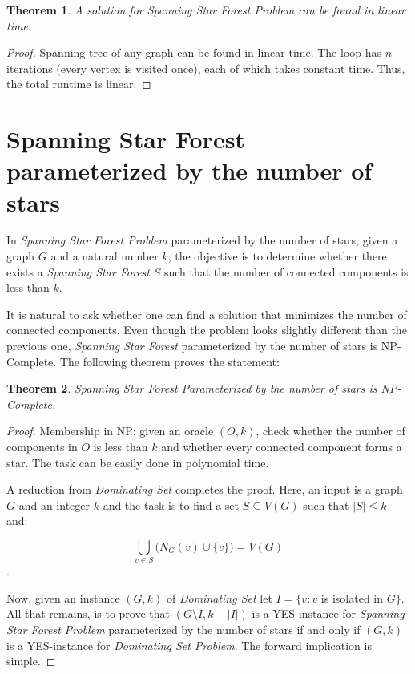 \documentclass[en]{pracamgr}
\newtheorem{theorem}{Theorem}
\begin{document}
\begin{theorem}
	A solution for Spanning Star Forest Problem can be found in linear time.
\end{theorem}

\begin{proof}
	Spanning tree of any graph can be found in linear time. The loop has $n$ 
	iterations (every vertex is visited once), each of which takes constant time.
	Thus, the total runtime is linear.
\end{proof}

\section{Spanning Star Forest parameterized by the number of stars}

In \emph{Spanning Star Forest Problem} parameterized by the number of
stars, given a graph $G$ and a natural number $k$, the objective is to
determine whether there exists a \emph{Spanning Star Forest} $S$ such that
the number of connected components is less than $k$.

It is natural to ask whether one can find a solution that minimizes the number
of connected components. Even though the problem looks slightly different
than the previous one, \emph{Spanning Star Forest} parameterized by the 
number of stars is NP-Complete. The following theorem proves the statement:

\begin{theorem}
	Spanning Star Forest Parameterized by the number of stars is NP-Complete.
\end{theorem}



\begin{proof}
	Membership in NP: given an oracle $(O,k)$, check whether the number of
	components in $O$ is less than $k$ and whether every connected component 
	forms a star. The task can be easily done in polynomial time.
	
	A reduction from \emph{Dominating Set} completes the proof. Here, an input
	is a graph $G$ and an integer $k$ and the task is to find a set 
	$S \subseteq V(G)$ such that $|S|\leq k$ and:
	
	$$\bigcup_{v \in S} \big(N_G(v) \cup \{v\}\big) = V(G)$$.
	
	Now, given an instance $(G,k)$ of \emph{Dominating Set} let $I = \{v: v$ is 
	isolated in $G\}$. All that remains, is to prove that $(G \setminus I,
	k-|I|)$ is a YES-instance for \emph{Spanning Star Forest Problem} 
	parameterized by the number of stars if and only if $(G,k)$ is a YES-instance 
	for \emph{Dominating Set Problem}. The forward implication is simple.
	
	
\end{proof}
\end{document}
